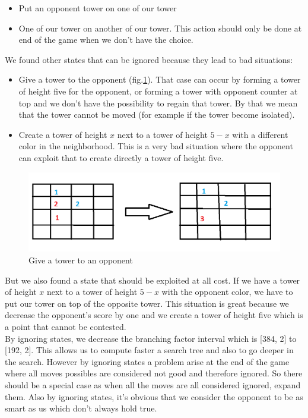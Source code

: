 \documentclass[10pt,a4paper]{article}
\begin{document}
\begin{itemize}
\item Put an opponent tower on one of our tower
\item One of our tower on another of our tower. This action should only be done at end of the game when we don't have the choice.
\end{itemize}

We found other states that can be ignored because they lead to bad situations:

\begin{itemize}
\item Give a tower to the opponent (fig.\ref{states_ignored}). That case can occur by forming a tower of height five for the opponent, or forming a tower with opponent counter at top and we don't have the possibility to regain that tower. By that we mean that the tower cannot be moved (for example if the tower become isolated).
\item Create a tower of height $x$ next to a tower of height $5-x$ with a different color in the neighborhood. This is a very bad situation where the opponent can exploit that to create directly a tower of height five. 
\end{itemize}

\begin{figure}[h]
\center
\includegraphics[scale=0.4]{img/states_ignored.png} 
\caption{\label{states_ignored} Give a tower to an opponent}
\end{figure}

But we also found a state that should be exploited at all cost. If we have a tower of height $x$ next to a tower of height $5-x$ with the opponent color, we have to put our tower on top of the opposite tower. This situation is great because we decrease the opponent's score by one and we create a tower of height five which is a point that cannot be contested. \\

By ignoring states, we decrease the branching factor interval which is [384, 2] to [192, 2]. This allows us to compute faster a search tree and also to go deeper in the search. However by ignoring states a problem arise at the end of the game where all moves possibles are considered not good and therefore ignored. So there should be a special case as when all the moves are all considered ignored, expand them. Also by ignoring states, it's obvious that we consider the opponent to be as smart as us which don't always hold true. 
\end{document}
